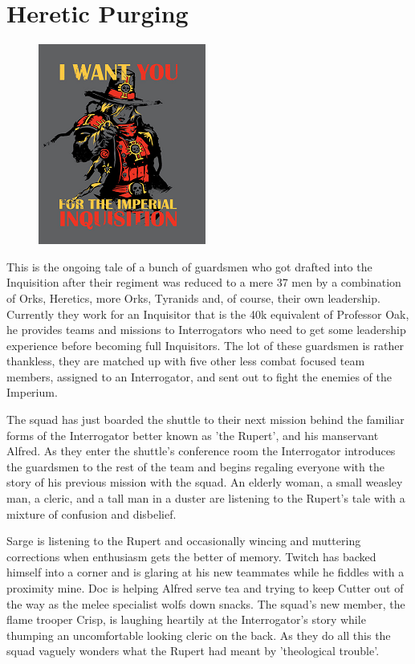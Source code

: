 \chapter{Heretic Purging}

\begin{figure}
	\begin{center}
		\includegraphics[width=\figwidth]{pics/6/1.png}
	\end{center}
\end{figure}
This is the ongoing tale of a bunch of guardsmen who got drafted into the Inquisition after their regiment was reduced to a mere 37 men by a combination of Orks, Heretics, more Orks, Tyranids and, of course, their own leadership. 
Currently they work for an Inquisitor that is the 40k equivalent of Professor Oak, he provides teams and missions to Interrogators who need to get some leadership experience before becoming full Inquisitors. 
The lot of these guardsmen is rather thankless, they are matched up with five other less combat focused team members, assigned to an Interrogator, and sent out to fight the enemies of the Imperium.


The squad has just boarded the shuttle to their next mission behind the familiar forms of the Interrogator better known as 'the Rupert', and his manservant Alfred. 
As they enter the shuttle's conference room the Interrogator introduces the guardsmen to the rest of the team and begins regaling everyone with the story of his previous mission with the squad. 
An elderly woman, a small weasley man, a cleric, and a tall man in a duster are listening to the Rupert's tale with a mixture of confusion and disbelief.

Sarge is listening to the Rupert and occasionally wincing and muttering corrections when enthusiasm gets the better of memory. 
Twitch has backed himself into a corner and is glaring at his new teammates while he fiddles with a proximity mine. 
Doc is helping Alfred serve tea and trying to keep Cutter out of the way as the melee specialist wolfs down snacks. 
The squad's new member, the flame trooper Crisp, is laughing heartily at the Interrogator's story while thumping an uncomfortable looking cleric on the back. 
As they do all this the squad vaguely wonders what the Rupert had meant by 'theological trouble'.

